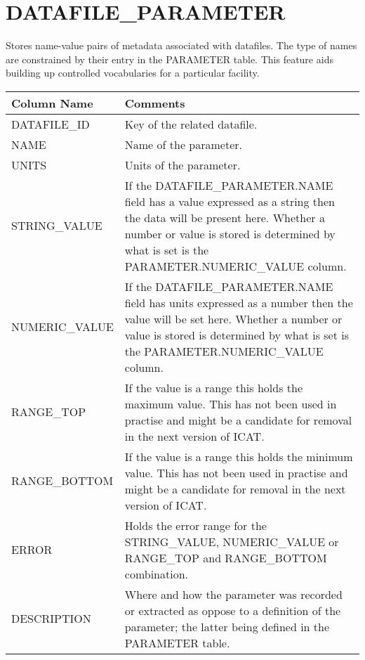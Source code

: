 \documentclass{report}
\begin{document}
\section{DATAFILE\_PARAMETER}

Stores name-value pairs of metadata associated with datafiles. The type of names are constrained by their entry in the PARAMETER table. This feature aids building up controlled vocabularies for a particular facility.\\

\begin{tabular}{|l|l|}
\hline
Column Name & Comments \\ \hline
DATAFILE\_ID & \multicolumn{1}{p{100mm}|}{
Key of the related datafile.} \\ \hline
NAME & \multicolumn{1}{p{100mm}|}{
Name of the parameter.} \\ \hline
UNITS & \multicolumn{1}{p{100mm}|}{
Units of the parameter.} \\ \hline
STRING\_VALUE & \multicolumn{1}{p{100mm}|}{
If the DATAFILE\_PARAMETER.NAME field has a value expressed as a string then the data will be present here. Whether a number or value is stored is determined by what is set is the PARAMETER.NUMERIC\_VALUE column.} \\ \hline
NUMERIC\_VALUE & \multicolumn{1}{p{100mm}|}{
If the DATAFILE\_PARAMETER.NAME field has units expressed as a number then the value will be set here. Whether a number or value is stored is determined by what is set is the PARAMETER.NUMERIC\_VALUE column.} \\ \hline
RANGE\_TOP & \multicolumn{1}{p{100mm}|}{
If the value is a range this holds the maximum value. This has not been used in practise and might be a candidate for removal in the next version of ICAT.} \\ \hline
RANGE\_BOTTOM & \multicolumn{1}{p{100mm}|}{
If the value is a range this holds the minimum value. This has not been used in practise and might be a candidate for removal in the next version of ICAT.} \\ \hline
ERROR & \multicolumn{1}{p{100mm}|}{
Holds the error range for the STRING\_VALUE, NUMERIC\_VALUE or RANGE\_TOP and RANGE\_BOTTOM combination.} \\ \hline
DESCRIPTION & \multicolumn{1}{p{100mm}|}{
Where and how the parameter was recorded or extracted as oppose to a definition of the parameter; the latter being defined in the PARAMETER table.} \\ \hline
\end{tabular}
\end{document}
